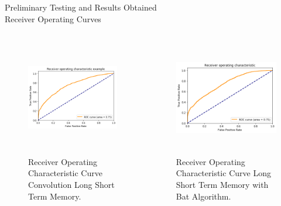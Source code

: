 \documentclass{beamer}
\begin{document}
\begin{frame}{Preliminary Testing and Results Obtained\\ \footnotesize{Receiver Operating Curves}}
    \begin{columns}
        \begin{column}{.5\textwidth}
            \begin{figure}[h]
            \centerline{\includegraphics[width=2in,height=2in]{clstm4.png}}
            \caption{Receiver Operating Characteristic Curve Convolution Long Short Term Memory.}
            \end{figure}
        \end{column}
        \begin{column}{5cm}
            \begin{figure}[h]
            \centerline{\includegraphics[width=2in,height=2in]{lstm-batalgorithm3.png}}
            \caption{Receiver Operating Characteristic Curve Long Short Term Memory with Bat Algorithm.}
            \end{figure}
        \end{column}
    \end{columns} 
    
\end{frame}
\end{document}
